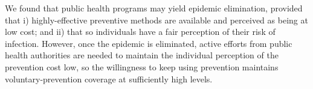 We found that public health programs may yield epidemic elimination, provided that i) highly-effective preventive methods are available and perceived as being at low cost; and ii) that so individuals have a fair perception of their risk of infection. However, once the epidemic is eliminated, active efforts from public health authorities are needed to maintain the individual perception of the prevention cost low, so the willingness to keep using prevention maintains voluntary-prevention coverage at sufficiently high levels.